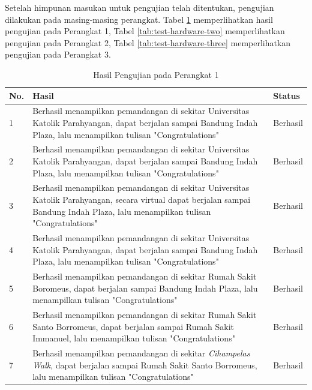 Setelah himpunan masukan untuk pengujian telah ditentukan, pengujian dilakukan pada masing-masing perangkat. Tabel \ref{tab:test-hardware-one} memperlihatkan hasil pengujian pada Perangkat 1, Tabel \ref{tab:test-hardware-two} memperlihatkan pengujian pada Perangkat 2, Tabel \ref{tab:test-hardware-three} memperlihatkan pengujian pada Perangkat 3.

\begin{table}[]
    \centering
    \caption{Hasil Pengujian pada Perangkat 1}
    \begin{tabular}{|p{1cm}||p{8cm}|p{3cm}|}
    \hline
       No. & Hasil & Status \\
    \hline \hline
        1 & Berhasil menampilkan pemandangan di sekitar Universitas Katolik Parahyangan, dapat berjalan sampai Bandung Indah Plaza, lalu menampilkan tulisan "Congratulations" & Berhasil\\
    \hline
        2 & Berhasil menampilkan pemandangan di sekitar Universitas Katolik Parahyangan, dapat berjalan sampai Bandung Indah Plaza, lalu menampilkan tulisan "Congratulations" & Berhasil \\
    \hline
        3 & Berhasil menampilkan pemandangan di sekitar Universitas Katolik Parahyangan, secara virtual dapat berjalan sampai Bandung Indah Plaza, lalu menampilkan tulisan "Congratulations" & Berhasil \\
        \hline
        4 & Berhasil menampilkan pemandangan di sekitar Universitas Katolik Parahyangan, dapat berjalan sampai Bandung Indah Plaza, lalu menampilkan tulisan "Congratulations" & Berhasil \\
        \hline
        5 & Berhasil menampilkan pemandangan di sekitar Rumah Sakit Boromeus, dapat berjalan sampai Bandung Indah Plaza, lalu menampilkan tulisan "Congratulations" & Berhasil\\ 
        \hline
        6 & Berhasil menampilkan pemandangan di sekitar Rumah Sakit Santo Borromeus, dapat berjalan sampai Rumah Sakit Immanuel, lalu menampilkan tulisan "Congratulations" & Berhasil \\
        \hline 
        7 & Berhasil menampilkan pemandangan di sekitar \textit{Cihampelas Walk}, dapat berjalan sampai Rumah Sakit Santo Borromeus, lalu menampilkan tulisan "Congratulations" & Berhasil \\
    \hline
    \end{tabular}
    \label{tab:test-hardware-one}
\end{table} 

